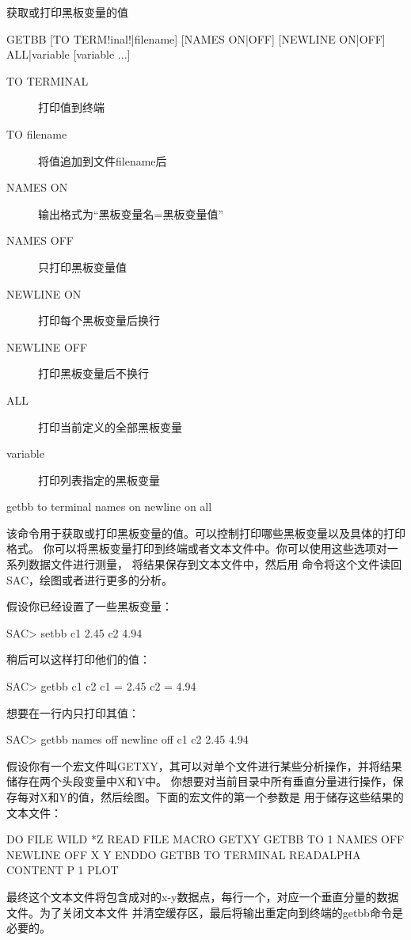 \label{cmd:getbb}

获取或打印黑板变量的值

\begin{SACSTX}
GETBB [TO TERM!inal!|filename] [NAMES ON|OFF] [NEWLINE ON|OFF]
    ALL|variable [variable ...]
\end{SACSTX}

\begin{description}
\item [TO TERMINAL] 打印值到终端
\item [TO filename] 将值追加到文件filename后
\item [NAMES ON] 输出格式为``黑板变量名=黑板变量值''
\item [NAMES OFF] 只打印黑板变量值
\item [NEWLINE ON] 打印每个黑板变量后换行
\item [NEWLINE OFF] 打印黑板变量后不换行
\item [ALL] 打印当前定义的全部黑板变量
\item [variable] 打印列表指定的黑板变量
\end{description}

\begin{SACDFT}
getbb to terminal names on newline on all
\end{SACDFT}

该命令用于获取或打印黑板变量的值。可以控制打印哪些黑板变量以及具体的打印格式。
你可以将黑板变量打印到终端或者文本文件中。你可以使用这些选项对一系列数据文件进行测量，
将结果保存到文本文件中，然后用  命令将这个文件读回SAC，绘图或者进行更多的分析。

假设你已经设置了一些黑板变量：
\begin{SACCode}
SAC> setbb c1 2.45 c2 4.94
\end{SACCode}

稍后可以这样打印他们的值：
\begin{SACCode}
SAC> getbb c1 c2
 c1 = 2.45
 c2 = 4.94
\end{SACCode}

想要在一行内只打印其值：
\begin{SACCode}
SAC> getbb names off newline off c1 c2
 2.45 4.94
\end{SACCode}

假设你有一个宏文件叫GETXY，其可以对单个文件进行某些分析操作，并将结果储存在两个头段变量中X和Y中。
你想要对当前目录中所有垂直分量进行操作，保存每对X和Y的值，然后绘图。下面的宏文件的第一个参数是
用于储存这些结果的文本文件：
\begin{SACCode}
DO FILE WILD *Z
  READ FILE
  MACRO GETXY
  GETBB TO 1 NAMES OFF NEWLINE OFF X Y
ENDDO
GETBB TO TERMINAL
READALPHA CONTENT P 1
PLOT
\end{SACCode}
最终这个文本文件将包含成对的x-y数据点，每行一个，对应一个垂直分量的数据文件。为了关闭文本文件
并清空缓存区，最后将输出重定向到终端的getbb命令是必要的。
